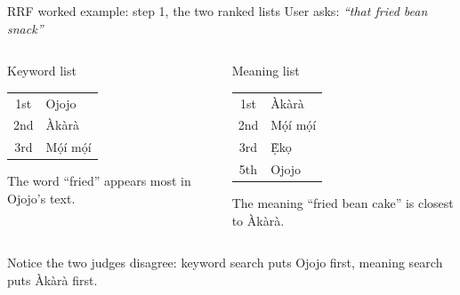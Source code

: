 \documentclass[aspectratio=169,11pt]{beamer}
\begin{document}
\begin{frame}{RRF worked example: step 1, the two ranked lists}
  \centering
  User asks: \textit{``that fried bean snack''}
  \vspace{0.3cm}

  \begin{columns}[T]
      \begin{block}{Keyword list}
        \small
        \begin{tabular}{@{}cl@{}}
          1st & Ojojo \\
          2nd & Àkàrà \\
          3rd & Mọ́í mọ́í \\
        \end{tabular}

        \footnotesize The word ``fried'' appears most in Ojojo's text.
      \end{block}
      \begin{block}{Meaning list}
        \small
        \begin{tabular}{@{}cl@{}}
          1st & Àkàrà \\
          2nd & Mọ́í mọ́í \\
          3rd & Ẹ̀kọ \\
          5th & Ojojo \\
        \end{tabular}

        \footnotesize The meaning ``fried bean cake'' is closest to Àkàrà.
      \end{block}
  \end{columns}

  \vspace{0.2cm}
  {\small Notice the two judges disagree: keyword search puts Ojojo first, meaning search puts Àkàrà first.}
\end{frame}
\end{document}

